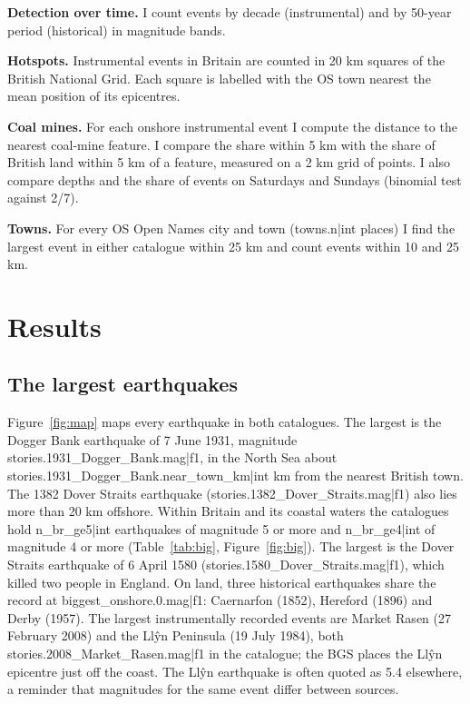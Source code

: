 \documentclass[11pt,a4paper]{article}
\begin{document}
\textbf{Detection over time.} I count events by decade (instrumental) and by 50-year period (historical) in magnitude bands.

\textbf{Hotspots.} Instrumental events in Britain are counted in 20 km squares of the British National Grid. Each square is labelled with the OS town nearest the mean position of its epicentres.

\textbf{Coal mines.} For each onshore instrumental event I compute the distance to the nearest coal-mine feature. I compare the share within 5 km with the share of British land within 5 km of a feature, measured on a 2 km grid of points. I also compare depths and the share of events on Saturdays and Sundays (binomial test against 2/7).

\textbf{Towns.} For every OS Open Names city and town ({{towns.n|int}} places) I find the largest event in either catalogue within 25 km and count events within 10 and 25 km.

\section{Results}

\subsection{The largest earthquakes}

Figure~\ref{fig:map} maps every earthquake in both catalogues. The largest is the Dogger Bank earthquake of 7 June 1931, magnitude {{stories.1931_Dogger_Bank.mag|f1}}, in the North Sea about {{stories.1931_Dogger_Bank.near_town_km|int}} km from the nearest British town. The 1382 Dover Straits earthquake ({{stories.1382_Dover_Straits.mag|f1}}) also lies more than 20 km offshore. Within Britain and its coastal waters the catalogues hold {{n_br_ge5|int}} earthquakes of magnitude 5 or more and {{n_br_ge4|int}} of magnitude 4 or more (Table~\ref{tab:big}, Figure~\ref{fig:big}). The largest is the Dover Straits earthquake of 6 April 1580 ({{stories.1580_Dover_Straits.mag|f1}}), which killed two people in England. On land, three historical earthquakes share the record at {{biggest_onshore.0.mag|f1}}: Caernarfon (1852), Hereford (1896) and Derby (1957). The largest instrumentally recorded events are Market Rasen (27 February 2008) and the Ll\^{y}n Peninsula (19 July 1984), both {{stories.2008_Market_Rasen.mag|f1}} in the catalogue; the BGS places the Ll\^{y}n epicentre just off the coast. The Ll\^{y}n earthquake is often quoted as 5.4 elsewhere, a reminder that magnitudes for the same event differ between sources.
\end{document}
